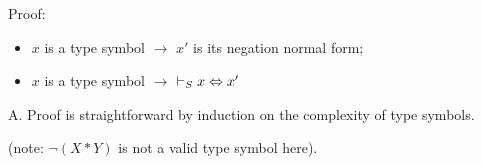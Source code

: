 \documentclass{beamer}
\begin{document}
\begin{frame}

Proof: \begin{itemize}
  \item[A.] $x$ is a type symbol $\rightarrow$ $x'$ is its negation normal form;
  \item[B.] $x$ is a type symbol $\rightarrow$ $\vdash_{\small S} x \Leftrightarrow x'$
\end{itemize}
\pause
\begin{block}{A.}
Proof is straightforward by induction on the complexity of type symbols.\\

\end{block}
(note: $\neg (X * Y)$ is not a valid type symbol here).
  
\end{frame}
\end{document}
